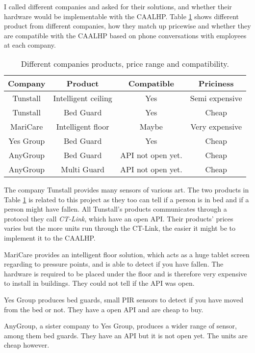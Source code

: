 I called different companies and asked for their solutions, and whether their hardware would be implementable with the CAALHP.
Table \ref{tab:Compare} shows different product from different companies, how they match up pricewise and whether they are compatible with the CAALHP based on phone conversations with employees at each company.

\begin{table}[htbp]
\centering
\begin{tabular}{cccc}
\textbf{Company}  & \textbf{Product} & \textbf{Compatible} & \textbf{Priciness} \\ \hline
\rowcolor{gr} 
Tunstall  & Intelligent ceiling\cite{Tun-Loft} & Yes & Semi expensive \\
Tunstall  & Bed Guard\cite{Tun-bed} & Yes & Cheap \\
\rowcolor{gr} 
MariCare & Intelligent floor\cite{Elsi}  & Maybe & Very expensive \\ 
Yes Group & Bed Guard\cite{YG-bed} & Yes & Cheap \\
\rowcolor{gr} 
AnyGroup & Bed Guard\cite{AnyGroup-bedguard} & API not open yet. & Cheap\\
AnyGroup & Multi Guard\cite{AnyGroup-multiguard} & API not open yet. & Cheap \\\hline
\end{tabular}
\caption{Different companies products, price range and compatibility.}
\label{tab:Compare}
\end{table}

The company Tunstall provides many sensors of various art.
The two products in Table \ref{tab:Compare} is related to this project as they too can tell if a person is in bed and if a person might have fallen.
All Tunstall's products communicates through a protocol they call \textit{CT-Link}, which have an open API.
Their products' prices varies but the more units run through the CT-Link, the easier it might be to implement it to the CAALHP.

MariCare provides an intelligent floor solution, which acts as a huge tablet screen regarding to pressure points, and is able to detect if you have fallen.
The hardware is required to be placed under the floor and is therefore very expensive to install in buildings.
They could not tell if the API was open.

Yes Group produces bed guards, small PIR sensors to detect if you have moved from the bed or not.
They have a open API and are cheap to buy.

AnyGroup, a sister company to Yes Group, produces a wider range of sensor, among them bed guards.
They have an API but it is not open yet. 
The units are cheap however.